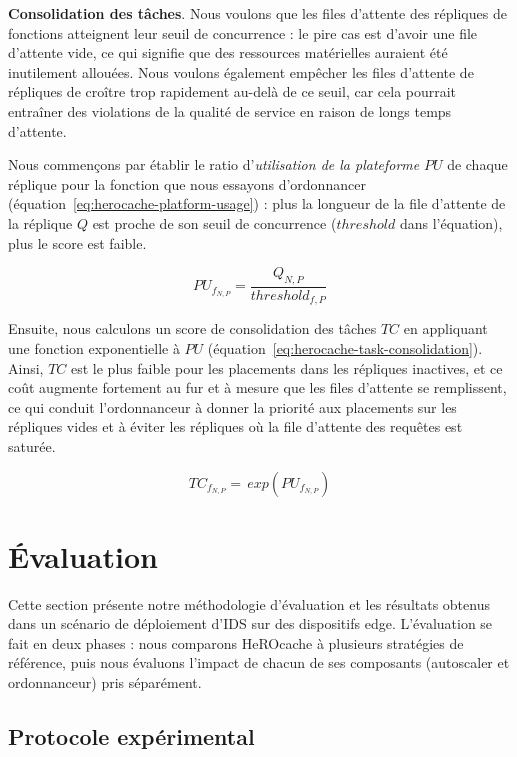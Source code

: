 {\textbf{Consolidation des tâches}. Nous voulons que les files d'attente des répliques de fonctions atteignent leur seuil de concurrence : le pire cas est d'avoir une file d'attente vide, ce qui signifie que des ressources matérielles auraient été inutilement allouées. Nous voulons également empêcher les files d'attente de répliques de croître trop rapidement au-delà de ce seuil, car cela pourrait entraîner des violations de la qualité de service en raison de longs temps d'attente.

Nous commençons par établir le ratio d'\textit{utilisation de la plateforme} $PU$ de chaque réplique pour la fonction que nous essayons d'ordonnancer (équation~\ref{eq:herocache-platform-usage}) : plus la longueur de la file d'attente de la réplique $Q$ est proche de son seuil de concurrence ($threshold$ dans l'équation), plus le score est faible.

\begin{equation}
    PU_{f_{N, P}} = \frac{Q_{N, P}}{threshold_{f, P}}
\label{eq:herocache-platform-usage}
\end{equation}

Ensuite, nous calculons un score de consolidation des tâches $TC$ en appliquant une fonction exponentielle à $PU$ (équation~\ref{eq:herocache-task-consolidation}). Ainsi, $TC$ est le plus faible pour les placements dans les répliques inactives, et ce coût augmente fortement au fur et à mesure que les files d'attente se remplissent, ce qui conduit l'ordonnanceur à donner la priorité aux placements sur les répliques vides et à éviter les répliques où la file d'attente des requêtes est saturée.

\begin{equation}
    TC_{{f}_{N, P}} = \, exp(PU_{f_{N, P}})
\label{eq:herocache-task-consolidation}
\end{equation}

\section{Évaluation}
\label{section:herocache-evaluation}

Cette section présente notre méthodologie d'évaluation et les résultats obtenus dans un scénario de déploiement d'\gls{IDS} sur des dispositifs edge. L'évaluation se fait en deux phases : nous comparons HeROcache à plusieurs stratégies de référence, puis nous évaluons l'impact de chacun de ses composants (autoscaler et ordonnanceur) pris séparément.

\subsection{Protocole expérimental}

}

